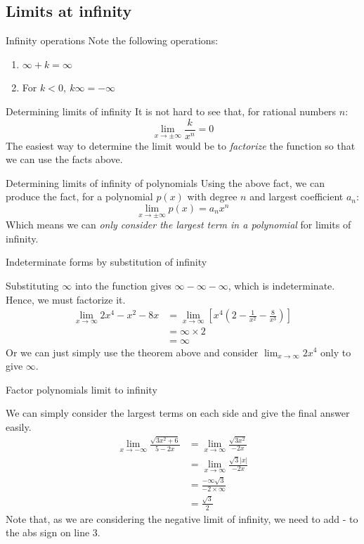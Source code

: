 \documentclass{article}
\begin{document}
\subsection{Limits at infinity}
\begin{theorem}
  {Infinity operations}
  Note the following operations:
  \begin{enumerate}
    \item $\infty + k=\infty$
    \item For $k<0,\ k\infty=-\infty$
  \end{enumerate}
\end{theorem}
\begin{knBox}
  {Determining limits of infinity}
  It is not hard to see that, for rational numbers $n$:
  \[\lim_{x\to\pm\infty}\frac{k}{x^n}=0\]
  The easiest way to determine the limit would be to \emph{factorize} the function so that we can use the facts above.
\end{knBox}
\begin{theorem}
  {Determining limits of infinity of polynomials}
  Using the above fact, we can produce the fact, for a polynomial $p(x)$ with degree $n$ and largest coefficient $a_n$:
  \[\lim_{x\to\pm\infty}p(x)=a_nx^n\]
  Which means we can \emph{only consider the largest term in a polynomial} for limits of infinity.
\end{theorem}
\begin{example}
  Indeterminate forms by substitution of infinity

  Substituting $\infty$ into the function gives $\infty-\infty-\infty$, which is indeterminate. Hence, we must factorize it.
  \begin{align*}
    \lim_{x\to\infty}2x^4-x^2-8x & =\lim_{x\to\infty}[x^4(2-\frac{1}{x^2}-\frac{8}{x^3})] \\
                                 & =\infty\times 2                                        \\
                                 & =\infty
  \end{align*}
  Or we can just simply use the theorem above and consider $\lim_{x\to\infty}2x^4$ only to give $\infty$.
\end{example}
\begin{example}
  Factor polynomials limit to infinity

  We can simply consider the largest terms on each side and give the final answer easily.
  \begin{align*}
    \lim_{x \to -\infty } \frac{{\sqrt {3{x^2} + 6} }}{{5 - 2x}} & =\lim_{x \to \infty }\frac{\sqrt{3x^2}}{-2x} \\
                                                                 & =\lim_{x \to \infty }\frac{\sqrt{3}|x|}{-2x} \\
                                                                 & =\frac{-\infty\sqrt{3}}{-2\times\infty}      \\
                                                                 & =\frac{\sqrt{3}}{2}
  \end{align*}
  Note that, as we are considering the negative limit of infinity, we need to add - to the abs sign on line 3.
\end{example}
\end{document}
